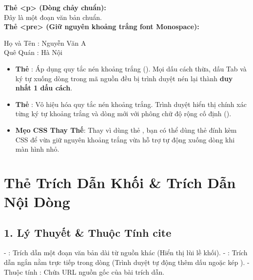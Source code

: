 \begin{browserWindow}
\sffamily\small
\textbf{Thẻ <p> (Dòng chảy chuẩn):}\\[2pt]
Đây là một đoạn văn bản chuẩn.\\[6pt]
\textbf{Thẻ <pre> (Giữ nguyên khoảng trắng font Monospace):}\\[2pt]
\begin{tcolorbox}[colback=gray!8, colframe=gray!20, boxrule=0.5pt, arc=3pt]
\ttfamily\small
Họ và Tên    : Nguyễn Văn A\\
Quê Quán     : Hà Nội
\end{tcolorbox}
\end{browserWindow}

\begin{conceptBox}
\begin{itemize}[leftmargin=1.5em, itemsep=3pt]
    \item \textbf{Thẻ }: Áp dụng quy tắc nén khoảng trắng (). Mọi dấu cách thừa, dấu Tab và ký tự xuống dòng trong mã nguồn đều bị trình duyệt nén lại thành \textbf{duy nhất 1 dấu cách}.
    \item \textbf{Thẻ }: Vô hiệu hóa quy tắc nén khoảng trắng. Trình duyệt hiển thị chính xác từng ký tự khoảng trắng và dòng mới với phông chữ độ rộng cố định ().
    \item \textbf{Mẹo CSS Thay Thế}: Thay vì dùng thẻ , bạn có thể dùng thẻ  đính kèm CSS  để vừa giữ nguyên khoảng trắng vừa hỗ trợ tự động xuống dòng khi màn hình nhỏ.
\end{itemize}
\end{conceptBox}

\section{Thẻ Trích Dẫn Khối  \& Trích Dẫn Nội Dòng }
\subsection{1. Lý Thuyết \& Thuộc Tính cite}
- : Trích dẫn một đoạn văn bản dài từ nguồn khác (Hiển thị lùi lề khối).
- : Trích dẫn ngắn nằm trực tiếp trong dòng (Trình duyệt tự động thêm dấu ngoặc kép ).
- Thuộc tính : Chứa URL nguồn gốc của bài trích dẫn.

